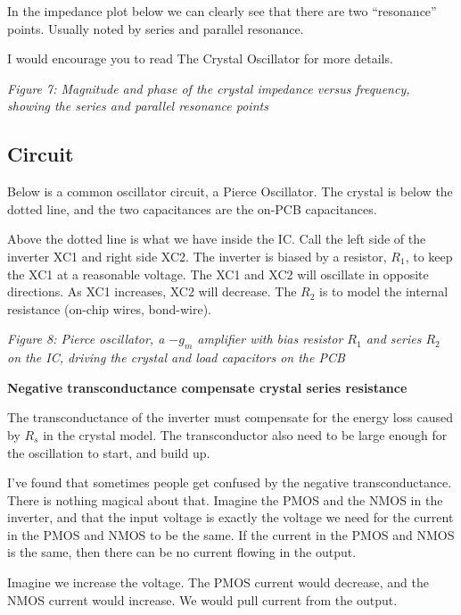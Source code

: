 In the impedance plot below we can clearly see that there are two
``resonance'' points. Usually noted by series and parallel resonance.

I would encourage you to read The Crystal Oscillator
 for more details.


{
\centering
{}
}

\emph{Figure 7: Magnitude and phase of the crystal impedance versus
frequency, showing the series and parallel resonance points}

\subsection{Circuit}\label{circuit}

Below is a common oscillator circuit, a Pierce Oscillator. The crystal
is below the dotted line, and the two capacitances are the on-PCB
capacitances.

Above the dotted line is what we have inside the IC. Call the left side
of the inverter XC1 and right side XC2. The inverter is biased by a
resistor, \(R_1\), to keep the XC1 at a reasonable voltage. The XC1 and
XC2 will oscillate in opposite directions. As XC1 increases, XC2 will
decrease. The \(R_2\) is to model the internal resistance (on-chip
wires, bond-wire).


{
\centering
{}
}

\emph{Figure 8: Pierce oscillator, a \(-g_m\) amplifier with bias
resistor \(R_1\) and series \(R_2\) on the IC, driving the crystal and
load capacitors on the PCB}

\textbf{Negative transconductance compensate crystal series resistance}

The transconductance of the inverter must compensate for the energy loss
caused by \(R_s\) in the crystal model. The transconductor also need to
be large enough for the oscillation to start, and build up.

I've found that sometimes people get confused by the negative
transconductance. There is nothing magical about that. Imagine the PMOS
and the NMOS in the inverter, and that the input voltage is exactly the
voltage we need for the current in the PMOS and NMOS to be the same. If
the current in the PMOS and NMOS is the same, then there can be no
current flowing in the output.

Imagine we increase the voltage. The PMOS current would decrease, and
the NMOS current would increase. We would pull current from the output.

